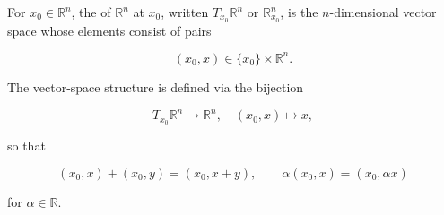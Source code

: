 For $x_0 \in \mathbb{R}^n$, the  of $\mathbb{R}^n$ at $x_0$, written $T_{x_0}\mathbb{R}^n$ or $\mathbb{R}_{x_0}^n$, is the $n$-dimensional vector space whose elements consist of pairs

$$(x_0, x) \in \{x_0\} \times \mathbb{R}^n.$$

The vector-space structure is defined via the bijection

$$T_{x_0}\mathbb{R}^n \to \mathbb{R}^n, \quad (x_0, x) \mapsto x,$$

so that

$$(x_0, x) + (x_0, y) = (x_0, x + y), \qquad \alpha(x_0, x) = (x_0, \alpha x)$$

for $\alpha \in \mathbb{R}$.
